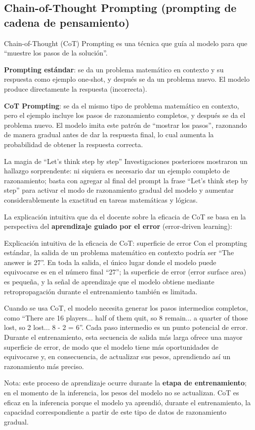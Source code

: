 \subsection{Chain-of-Thought Prompting (prompting de cadena de pensamiento)}

Chain-of-Thought (CoT) Prompting es una técnica que guía al modelo para que ``muestre los pasos de la solución''.

\textbf{Prompting estándar}: se da un problema matemático en contexto y su respuesta como ejemplo one-shot, y después se da un problema nuevo. El modelo produce directamente la respuesta (incorrecta).

\textbf{CoT Prompting}: se da el mismo tipo de problema matemático en contexto, pero el ejemplo incluye los pasos de razonamiento completos, y después se da el problema nuevo. El modelo imita este patrón de ``mostrar los pasos'', razonando de manera gradual antes de dar la respuesta final, lo cual aumenta la probabilidad de obtener la respuesta correcta.

\begin{importantbox}{La magia de ``Let's think step by step''}
Investigaciones posteriores mostraron un hallazgo sorprendente: ni siquiera es necesario dar un ejemplo completo de razonamiento; basta con agregar al final del prompt la frase ``Let's think step by step'' para activar el modo de razonamiento gradual del modelo y aumentar considerablemente la exactitud en tareas matemáticas y lógicas.
\end{importantbox}

La explicación intuitiva que da el docente sobre la eficacia de CoT se basa en la perspectiva del \textbf{aprendizaje guiado por el error} (error-driven learning):

\begin{knowledgebox}{Explicación intuitiva de la eficacia de CoT: superficie de error}
Con el prompting estándar, la salida de un problema matemático en contexto podría ser ``The answer is 27''. En toda la salida, el único lugar donde el modelo puede equivocarse es en el número final ``27''; la superficie de error (error surface area) es pequeña, y la señal de aprendizaje que el modelo obtiene mediante retropropagación durante el entrenamiento también es limitada.

Cuando se usa CoT, el modelo necesita generar los pasos intermedios completos, como ``There are 16 players... half of them quit, so 8 remain... a quarter of those lost, so 2 lost... 8 - 2 = 6''. Cada paso intermedio es un punto potencial de error. Durante el entrenamiento, esta secuencia de salida más larga ofrece una mayor superficie de error, de modo que el modelo tiene más oportunidades de equivocarse y, en consecuencia, de actualizar sus pesos, aprendiendo así un razonamiento más preciso.

Nota: este proceso de aprendizaje ocurre durante la \textbf{etapa de entrenamiento}; en el momento de la inferencia, los pesos del modelo no se actualizan. CoT es eficaz en la inferencia porque el modelo ya aprendió, durante el entrenamiento, la capacidad correspondiente a partir de este tipo de datos de razonamiento gradual.
\end{knowledgebox}

